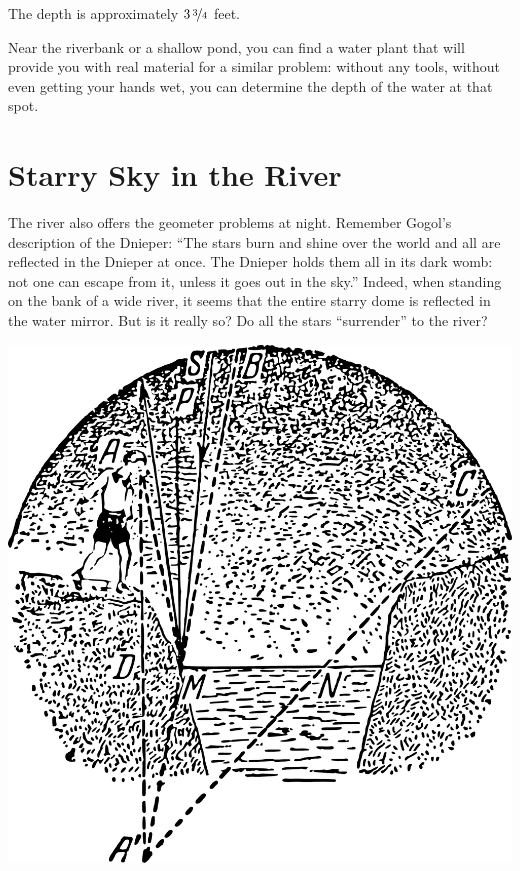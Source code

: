 The depth is approximately $3\,\nicefrac{3}{4}$ feet.

Near the riverbank or a shallow pond, you can find a water plant that will provide you with real material for a similar problem: without any tools, without even getting your hands wet, you can determine the depth of the water at that spot.



\section{Starry Sky in the River}
\label{sec-2.16}

The river also offers the geometer problems at night. Remember Gogol's description of the Dnieper: ``The stars burn and shine over the world and all are reflected in the Dnieper at once. The Dnieper holds them all in its dark womb: not one can escape from it, unless it goes out in the sky.'' Indeed, when standing on the bank of a wide river, it seems that the entire starry dome is reflected in the water mirror. But is it really so? Do all the stars ``surrender'' to the river?

\begin{marginfigure}%
\centering
\includegraphics[width=1.\textwidth]{figures/ch-02/fig-054.pdf}
\end{marginfigure}

